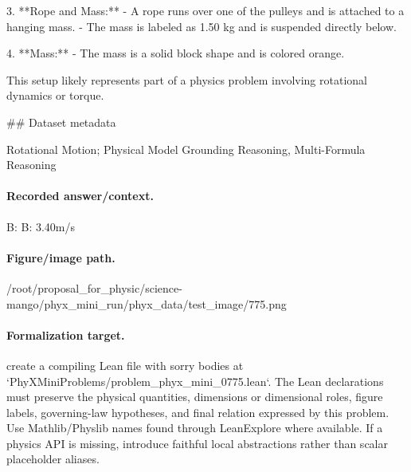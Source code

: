 3. **Rope and Mass:**
   - A rope runs over one of the pulleys and is attached to a hanging mass.
   - The mass is labeled as 1.50 kg and is suspended directly below.

4. **Mass:** 
   - The mass is a solid block shape and is colored orange.

This setup likely represents part of a physics problem involving rotational dynamics or torque.

\#\# Dataset metadata

Rotational Motion; Physical Model Grounding Reasoning, Multi-Formula Reasoning

\paragraph{Recorded answer/context.}
B: B: 3.40m/s

\paragraph{Figure/image path.}
/root/proposal\_for\_physic/science-mango/phyx\_mini\_run/phyx\_data/test\_image/775.png

\paragraph{Formalization target.}
create a compiling Lean file with sorry bodies at `PhyXMiniProblems/problem\_phyx\_mini\_0775.lean`. The Lean declarations must preserve the physical quantities, dimensions or dimensional roles, figure labels, governing-law hypotheses, and final relation expressed by this problem.
Use Mathlib/Physlib names found through LeanExplore where available. If a physics API is missing, introduce faithful local abstractions rather than scalar placeholder aliases.

